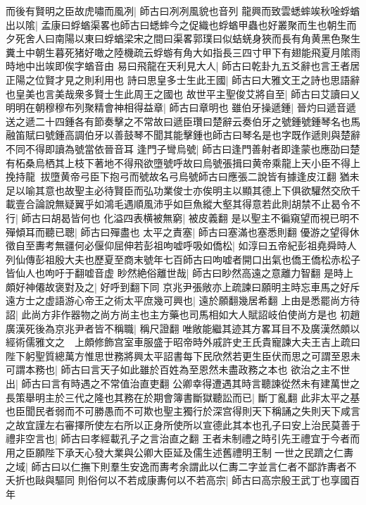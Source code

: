 而後有賢明之臣故虎嘯而風冽|{
	師古曰冽冽風貌也音列}
龍興而致雲蟋蟀竢秋唫蜉蝤出以隂|{
	孟康曰蜉蝤渠畧也師古曰蟋蟀今之促織也蜉蝤甲蟲也好叢聚而生也朝生而夕死舍人曰南陽以東曰蜉蝤梁宋之間曰渠畧郭璞曰似蛣蜣身狹而長有角黄黑色聚生糞土中朝生暮死猪好噉之陸機疏云蜉蝣有角大如指長三四寸甲下有翅能飛夏月隂雨時地中出竢即俟字蝤音由}
易曰飛龍在天利見大人|{
	師古曰乾卦九五爻辭也言王者居正陽之位賢才見之則利用也}
詩曰思皇多士生此王國|{
	師古曰大雅文王之詩也思語辭也皇美也言美哉衆多賢士生此周王之國也}
故世平主聖俊艾將自至|{
	師古曰艾讀曰乂}
明明在朝穆穆布列聚精會神相得益章|{
	師古曰章明也}
雖伯牙操遞鍾|{
	晉灼曰遞音遞送之遞二十四鍾各有節奏擊之不常故曰遞臣瓚曰楚辭云奏伯牙之號鍾號鍾琴名也馬融笛賦曰號鍾高調伯牙以善鼓琴不聞其能擊鍾也師古曰琴名是也字既作遞則與楚辭不同不得即讀為號當依晉音耳}
逢門子彎烏號|{
	師古曰逢門善射者即逢蒙也應劭曰楚有柘桑烏栖其上枝下著地不得飛欲墮號呼故曰烏號張揖曰黄帝乘龍上天小臣不得上挽持龍拔墮黄帝弓臣下抱弓而號故名弓烏號師古曰應張二說皆有據逢皮江翻}
猶未足以喻其意也故聖主必待賢臣而弘功業俊士亦俟明主以顯其德上下俱欲驩然交欣千載壹合論說無疑翼乎如鴻毛遇順風沛乎如巨魚縱大壑其得意若此則胡禁不止曷令不行|{
	師古曰胡曷皆何也}
化溢四表横被無窮|{
	被皮義翻}
是以聖主不徧窺望而視已明不殫傾耳而聽已聰|{
	師古曰殫盡也}
太平之責塞|{
	師古曰塞滿也塞悉則翻}
優游之望得休徵自至夀考無疆何必偃仰屈伸若彭祖呴嘘呼吸如僑松|{
	如淳曰五帝紀彭祖堯舜時人列仙傳彭祖殷大夫也歷夏至商末號年七百師古曰呴嘘者開口出氣也僑王僑松赤松子皆仙人也呴吁于翻嘘音虚}
眇然絶俗離世哉|{
	師古曰眇然高遠之意離力智翻}
是時上頗好神僊故褒對及之|{
	好呼到翻下同}
京兆尹張敞亦上疏諫曰願明主時忘車馬之好斥遠方士之虚語游心帝王之術太平庶幾可興也|{
	遠於願翻幾居希翻}
上由是悉罷尚方待詔|{
	此尚方非作器物之尚方尚主也主方藥也司馬相如大人賦詔岐伯使尚方是也}
初趙廣漢死後為京兆尹者皆不稱職|{
	稱尺證翻}
唯敞能繼其迹其方畧耳目不及廣漢然頗以經術儒雅文之　上頗修飾宫室車服盛于昭帝時外戚許史王氏貴寵諫大夫王吉上疏曰陛下躬聖質總萬方惟思世務將興太平詔書每下民欣然若更生臣伏而思之可謂至恩未可謂本務也|{
	師古曰言天子如此雖於百姓為至恩然未盡政務之本也}
欲治之主不世出|{
	師古曰言有時遇之不常值治直吏翻}
公卿幸得遭遇其時言聽諫從然未有建萬世之長策舉明主於三代之隆也其務在於期會簿書斷獄聽訟而已|{
	斷丁亂翻}
此非太平之基也臣聞民者弱而不可勝愚而不可欺也聖主獨行於深宫得則天下稱誦之失則天下咸言之故宜謹左右審擇所使左右所以正身所使所以宣德此其本也孔子曰安上治民莫善于禮非空言也|{
	師古曰孝經載孔子之言治直之翻}
王者未制禮之時引先王禮宜于今者而用之臣願陛下承天心發大業與公卿大臣延及儒生述舊禮明王制一世之民躋之仁夀之域|{
	師古曰以仁撫下則羣生安逸而夀考余謂此以仁夀二字並言仁者不鄙詐夀者不夭折也敺與驅同}
則俗何以不若成康夀何以不若高宗|{
	師古曰高宗殷王武丁也享國百年}
